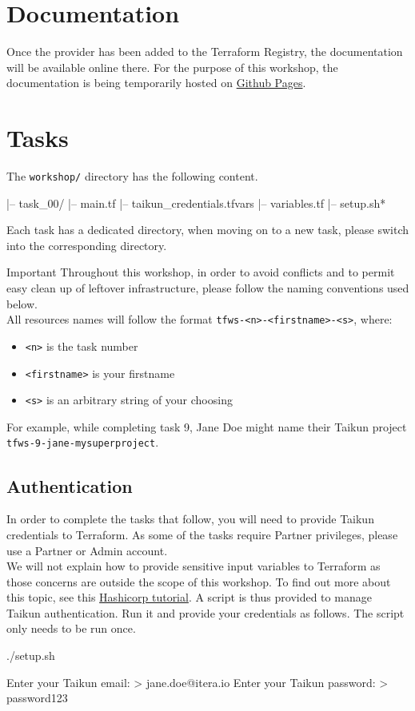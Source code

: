\section{Documentation}
Once the provider has been added to the Terraform Registry, the documentation will be available online there.
For the purpose of this workshop, the documentation is being temporarily hosted on \href{https://intuinewin.github.io/taikun-docs/}{Github Pages}.

\section{Tasks}

The \texttt{workshop/} directory has the following content.
\begin{raw}
|-- task_00/
    |-- main.tf
    |-- taikun_credentials.tfvars
    |-- variables.tf
|-- setup.sh*
\end{raw}
Each task has a dedicated directory, when moving on to a new task, please switch into the corresponding directory.

\begin{warn}{Important}
  Throughout this workshop, in order to avoid conflicts and
  to permit easy clean up of leftover infrastructure, please follow the naming conventions used below.\\

  All resources names will follow the format \texttt{tfws-<n>-<firstname>-<s>}, where:
  \begin{itemize}
    \item \texttt{<n>} is the task number
    \item \texttt{<firstname>} is your firstname
    \item \texttt{<s>} is an arbitrary string of your choosing
  \end{itemize}
  For example, while completing task 9, Jane Doe might name their Taikun project
  \texttt{tfws-9-jane-mysuperproject}.
\end{warn}

\subsection{Authentication}
In order to complete the tasks that follow, you will need to provide Taikun credentials to Terraform.
As some of the tasks require Partner privileges, please use a Partner or Admin account.\\

We will not explain how to provide sensitive input variables to Terraform as those concerns are outside the scope of this
workshop. %
To find out more about this topic, see this \href{https://learn.hashicorp.com/tutorials/terraform/sensitive-variables}{Hashicorp tutorial}.
A script is thus provided to manage Taikun authentication.
Run it and provide your credentials as follows. The script only needs to be run once.
\begin{shell}
./setup.sh
\end{shell}
\begin{raw}
Enter your Taikun email:
> jane.doe@itera.io
Enter your Taikun password:
> password123
\end{raw}

